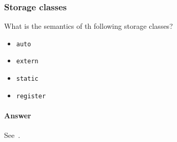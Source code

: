 \subsubsection*{Storage classes}
What is the semantics of th following storage classes?
\begin{itemize}
  \item \texttt{auto}
  \item \texttt{extern}
  \item \texttt{static}
  \item \texttt{register}
\end{itemize}

\paragraph{Answer}
See~.
